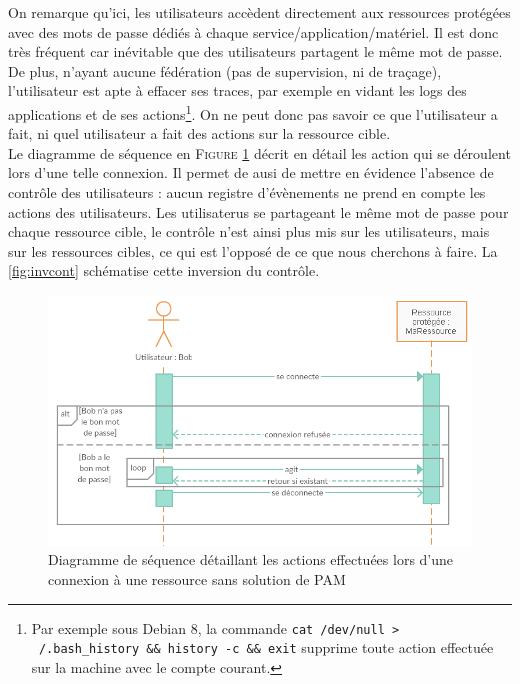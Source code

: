On remarque qu'ici, les utilisateurs accèdent directement aux ressources protégées avec des mots de passe dédiés à chaque service/application/matériel. Il est donc très fréquent car inévitable que des utilisateurs partagent le même mot de passe. De plus, n'ayant aucune fédération (pas de supervision, ni de traçage), l'utilisateur est apte à effacer ses traces, par exemple en vidant les logs des applications et de ses actions\footnote{Par exemple sous Debian 8, la commande \texttt{cat /dev/null > ~/.bash\_history \&\& history -c \&\& exit} supprime toute action effectuée sur la machine avec le compte courant.}. On ne peut donc pas savoir ce que l'utilisateur a fait, ni quel utilisateur a fait des actions sur la ressource cible.\\
Le diagramme de séquence en \textsc{Figure} \ref{fig:diagseq_sans_PAM} décrit en détail les action qui se déroulent lors d'une telle connexion. Il permet de ausi de mettre en évidence l'absence de contrôle des utilisateurs : aucun registre d'évènements ne prend en compte les actions des utilisateurs. Les utilisaterus se partageant le même mot de passe pour chaque ressource cible, le contrôle n'est ainsi plus mis sur les utilisateurs, mais sur les ressources cibles, ce qui est l'opposé de ce que nous cherchons à faire. La  \ref{fig:invcont} schématise cette inversion du contrôle. 

\begin{figure}[!ht]
    \center
    \includegraphics[width=\textwidth]{./images/Sequence_noPAM_use.png}
    \caption{Diagramme de séquence détaillant les actions effectuées lors d'une connexion à une ressource sans solution de PAM}
    \label{fig:diagseq_sans_PAM}
\end{figure}

